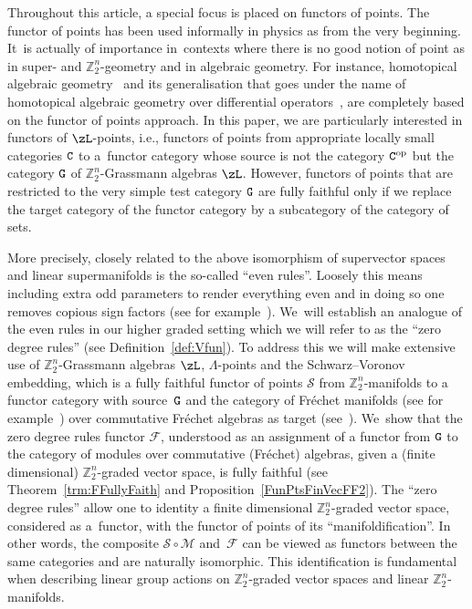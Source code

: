 \documentclass[pdftex]{sigma}%
\newcommand{\op}[1]{\operatorname{#1}}
\newcommand{\Z}{{\mathbb Z}}
\newcommand{\0}{\otimes}
\newcommand{\z}{\Z_2^n}
\numberwithin{equation}{section}
\begin{document}
Throughout this article, a special focus is placed on functors of points. The functor of points has been used informally in physics as from the very beginning. It~is actually of importance in~contexts where there is no good notion of point as in super- and $\Z_2^n$-geometry and in algebraic geometry. For instance, homotopical algebraic geometry~\cite{TVI, TVII} and its generalisation that goes under the name of homotopical algebraic geometry over differential operators~\cite{BPP:KTR, BPP:HAC}, are completely based on the functor of points approach. In this paper, we are particularly interested in functors of $\zL$-points, i.e., functors of points from appropriate locally small categories $\tt C$ to a~functor category whose source is not the category ${\tt C}^{\op{op}}$ but the category ${\tt G}$ of $\z$-Grassmann algebras $\zL$. However, functors of points that are restricted to the very simple test category ${\tt G}$ are fully faithful only if we replace the target category of the functor category by a subcategory of the category of sets.

More precisely, closely related to the above isomorphism of supervector spaces and linear supermanifolds is the so-called ``even rules''. Loosely this means including extra odd parameters to render everything even and in doing so one removes copious sign factors (see for example~\cite[Section~1.7]{Deligne:1999}). We~will establish an analogue of the even rules in our higher graded setting which we will refer to as the ``zero degree rules'' (see Definition~\ref{def:Vfun}). To address this we will make extensive use of $\Z_2^n$-Grassmann algebras $\zL$, $\Lambda$-points and the Schwarz--Voronov embedding, which is a fully faithful functor of points $\mathcal{S}$ from $\z$-manifolds to a functor category with source~${\tt G}$ and the category of Fr\'echet manifolds (see for
example~\cite{Hamilton:82}) over commutative Fr\'echet algebras as target (see~\cite{Bruce:2019b}). We~show that the zero degree rules functor $\mathcal F$, understood as an assignment of a functor from ${\tt G}$ to the category of modules over commutative (Fr\'echet) algebras, given a (finite dimensional) $\Z_2^n$-graded vector space, is fully faithful (see Theorem~\ref{trm:FFullyFaith} and Proposition~\ref{FunPtsFinVecFF2}). The ``zero degree rules'' allow one to identity a finite dimensional $\Z_2^n$-graded vector space, considered as a~functor, with the functor of points of its ``manifoldification''. In other words, the composite $\mathcal{S}\circ\mathcal{M}$ and~$\mathcal{F}$ can be viewed as functors between the same categories and are naturally isomorphic. This identification is fundamental when describing linear group actions on $\Z_2^n$-graded vector spaces and linear $\Z_2^n$-manifolds.
\end{document}
